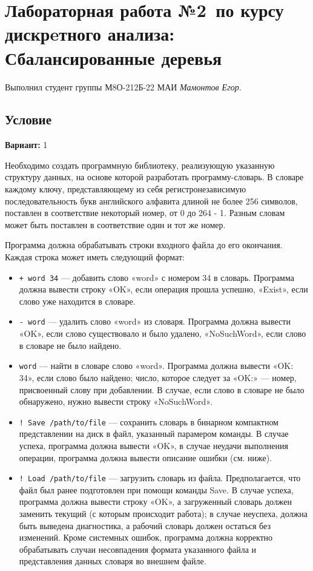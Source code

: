 \documentclass[12pt]{article}
\begin{document}
\section*{Лабораторная работа №2\, по курсу дискрeтного анализа: Сбалансированные деревья}

Выполнил студент группы М8О-212Б-22 МАИ \textit{Мамонтов Егор}.

\subsection*{Условие}

\textbf{Вариант:} 1

Необходимо создать программную библиотеку, реализующую указанную структуру данных, на основе которой разработать программу-словарь.
В словаре каждому ключу, представляющему из себя регистронезависимую последовательность букв английского алфавита длиной не более 256 символов,
поставлен в соответствие некоторый номер, от 0 до 264 - 1. Разным словам может быть поставлен в соответствие один и тот же номер.

Программа должна обрабатывать строки входного файла до его окончания. Каждая строка может иметь следующий формат:
\begin{itemize}
    \item \texttt{+ word 34} — добавить слово «word» с номером 34 в словарь. Программа должна вывести строку «OK», если операция прошла успешно,
    «Exist», если слово уже находится в словаре.

    \item \texttt{- word} — удалить слово «word» из словаря. Программа должна вывести «OK», если слово существовало и было удалено,
    «NoSuchWord», если слово в словаре не было найдено.

    \item \texttt{word} — найти в словаре слово «word». Программа должна вывести «OK: 34», если слово было найдено; число, которое следует за «OK:»
    — номер, присвоенный слову при добавлении. В случае, если слово в словаре не было обнаружено, нужно вывести строку «NoSuchWord».

    \item \texttt{! Save /path/to/file} — сохранить словарь в бинарном компактном представлении на диск в файл, указанный парамером команды.
    В случае успеха, программа должна вывести «OK», в случае неудачи выполнения операции, программа должна вывести описание ошибки (см. ниже).

    \item \texttt{! Load /path/to/file} — загрузить словарь из файла. Предполагается, что файл был ранее подготовлен при помощи команды Save. В случае успеха, программа должна вывести строку «OK», а загруженный словарь должен заменить текущий (с которым происходит работа); в случае неуспеха, должна быть выведена диагностика, а рабочий словарь должен остаться без изменений. Кроме системных ошибок, программа должна корректно обрабатывать случаи несовпадения формата указанного файла и представления данных словаря во внешнем файле.
\end{itemize}
\end{document}
